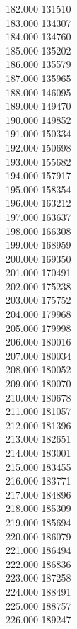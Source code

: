 { 182.000	131510 \\
 183.000	134307 \\
 184.000	134760 \\
 185.000	135202 \\
 186.000	135579 \\
 187.000	135965 \\
 188.000	146095 \\
 189.000	149470 \\
 190.000	149852 \\
 191.000	150334 \\
 192.000	150698 \\
 193.000	155682 \\
 194.000	157917 \\
 195.000	158354 \\
 196.000	163212 \\
 197.000	163637 \\
 198.000	166308 \\
 199.000	168959 \\
 200.000	169350 \\
 201.000	170491 \\
 202.000	175238 \\
 203.000	175752 \\
 204.000	179968 \\
 205.000	179998 \\
 206.000	180016 \\
 207.000	180034 \\
 208.000	180052 \\
 209.000	180070 \\
 210.000	180678 \\
 211.000	181057 \\
 212.000	181396 \\
 213.000	182651 \\
 214.000	183001 \\
 215.000	183455 \\
 216.000	183771 \\
 217.000	184896 \\
 218.000	185309 \\
 219.000	185694 \\
 220.000	186079 \\
 221.000	186494 \\
 222.000	186836 \\
 223.000	187258 \\
 224.000	188491 \\
 225.000	188757 \\
 226.000	189247 \\
}
